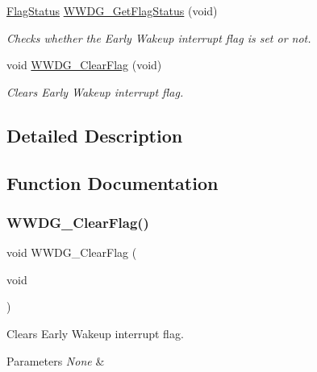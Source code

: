 \begin{DoxyCompactItemize}
\hyperlink{group___exported__types_ga89136caac2e14c55151f527ac02daaff}{Flag\+Status} \hyperlink{group___w_w_d_g___exported___functions_ga7df4882d45918b9b8249dfca1e44fabc}{W\+W\+D\+G\+\_\+\+Get\+Flag\+Status} (void)
\begin{DoxyCompactList}\small\item\em Checks whether the Early Wakeup interrupt flag is set or not. \end{DoxyCompactList}\item 
void \hyperlink{group___w_w_d_g___exported___functions_gabd2b5a6317c2e1a3ab0795838ce59dd2}{W\+W\+D\+G\+\_\+\+Clear\+Flag} (void)
\begin{DoxyCompactList}\small\item\em Clears Early Wakeup interrupt flag. \end{DoxyCompactList}\end{DoxyCompactItemize}


\subsection{Detailed Description}


\subsection{Function Documentation}
\mbox{\label{group___w_w_d_g___exported___functions_gabd2b5a6317c2e1a3ab0795838ce59dd2}} 
\subsubsection{\texorpdfstring{W\+W\+D\+G\+\_\+\+Clear\+Flag()}{WWDG\_ClearFlag()}}
{\footnotesize\ttfamily void W\+W\+D\+G\+\_\+\+Clear\+Flag (\begin{DoxyParamCaption}\item[{void}]{ }\end{DoxyParamCaption})}



Clears Early Wakeup interrupt flag. 


\begin{DoxyParams}{Parameters}
{\em None} & \\
\hline
\end{DoxyParams}


